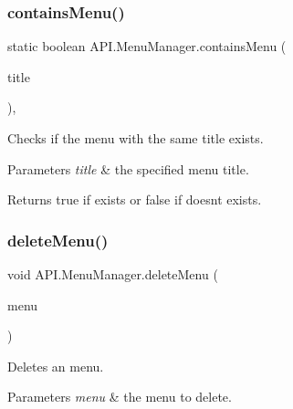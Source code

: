 \subsubsection{\texorpdfstring{contains\+Menu()}{containsMenu()}}
{\footnotesize\ttfamily static boolean A\+P\+I.\+Menu\+Manager.\+contains\+Menu (\begin{DoxyParamCaption}\item[{String}]{title }\end{DoxyParamCaption})\hspace{0.3cm}{\ttfamily [inline]}, {\ttfamily [static]}}

Checks if the menu with the same title exists. 
\begin{DoxyParams}{Parameters}
{\em title} & the specified menu title. \\
\hline
\end{DoxyParams}
\begin{DoxyReturn}{Returns}
true if exists or false if doesn\textquotesingle{}t exists. 
\end{DoxyReturn}
\mbox{\label{class_a_p_i_1_1_menu_manager_a171c35c1ecde734a3f145db60cd02ea4}} 
\subsubsection{\texorpdfstring{delete\+Menu()}{deleteMenu()}\hspace{0.1cm}{\footnotesize\ttfamily [1/2]}}
{\footnotesize\ttfamily void A\+P\+I.\+Menu\+Manager.\+delete\+Menu (\begin{DoxyParamCaption}\item[{\hyperlink{class_a_p_i_1_1_configurable_menu}{Configurable\+Menu}}]{menu }\end{DoxyParamCaption})\hspace{0.3cm}{\ttfamily [inline]}}

Deletes an menu. 
\begin{DoxyParams}{Parameters}
{\em menu} & the menu to delete. \\
\hline
\end{DoxyParams}
\mbox{\label{class_a_p_i_1_1_menu_manager_ae91bcce56f83bdfe318b23521ec19c3d}} 
